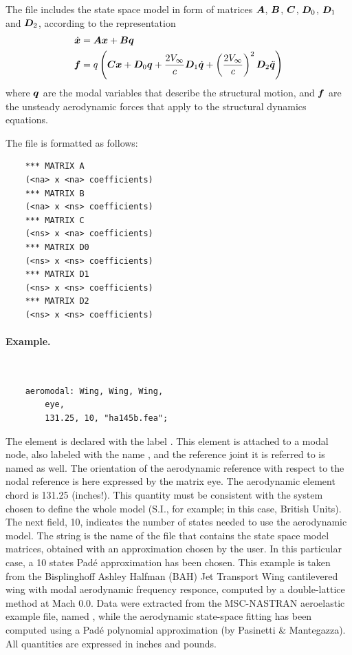 The  file includes the state space model in form 
of matrices $\boldsymbol{A}$, $\boldsymbol{B}$, $\boldsymbol{C}$, $\boldsymbol{D}_0$, $\boldsymbol{D}_1$ and $\boldsymbol{D}_2$,
according to the representation
\begin{align*}
	\dot{\boldsymbol{x}} &= \boldsymbol{A}\boldsymbol{x} + \boldsymbol{B}\boldsymbol{q} \\	
	\boldsymbol{f} &= q\left( \boldsymbol{C}\boldsymbol{x} + \boldsymbol{D}_0 \boldsymbol{q} + \frac{2V_{\infty}}{c} \boldsymbol{D}_1 \dot{\boldsymbol{q}} + \left( \frac{2V_{\infty}}{c} \right)^2 \boldsymbol{D}_2 \ddot{\boldsymbol{q}} \right)
\end{align*}
where $\boldsymbol{q}$ are the modal variables that describe the structural motion,
and $\boldsymbol{f}$ are the unsteady aerodynamic forces that apply to the structural
dynamics equations.

The file is formatted as follows:
\begin{verbatim}
    *** MATRIX A
    (<na> x <na> coefficients)
    *** MATRIX B
    (<na> x <ns> coefficients)
    *** MATRIX C
    (<ns> x <na> coefficients)
    *** MATRIX D0
    (<ns> x <ns> coefficients)
    *** MATRIX D1
    (<ns> x <ns> coefficients)
    *** MATRIX D2
    (<ns> x <ns> coefficients)
\end{verbatim}

\paragraph{Example.} \
\begin{verbatim}
    aeromodal: Wing, Wing, Wing,
        eye,
        131.25, 10, "ha145b.fea";
\end{verbatim}
The  element is declared with the label .
This element is attached to a modal node, also labeled
with the name , and the reference  joint 
it is referred to is named \kw{Wing} as well.
The orientation of the aerodynamic reference with respect 
to the nodal reference is here expressed by the matrix eye.
The aerodynamic element chord is 131.25 (inches!).
This quantity must be consistent with the system chosen to define 
the whole model (S.I., for example; in this case, British Units).
The next field, 10, indicates the number of states needed to use 
the aerodynamic model.
The string  is the name of the file that contains
the state space model matrices, obtained with an approximation 
chosen by the user.
In this particular case, a 10 states Pad\'e approximation 
has been chosen.
This example is taken from the Bisplinghoff Ashley Halfman
(BAH) Jet Transport Wing cantilevered wing with modal aerodynamic 
frequency responce, computed by a double-lattice method at Mach 0.0.
Data were extracted from the MSC-NASTRAN aeroelastic example file, 
named \kw{ha145b}, while the aerodynamic state-space fitting 
has been computed using a Pad\'e polynomial approximation
(by Pasinetti \& Mantegazza).
All quantities are expressed in inches and pounds.



